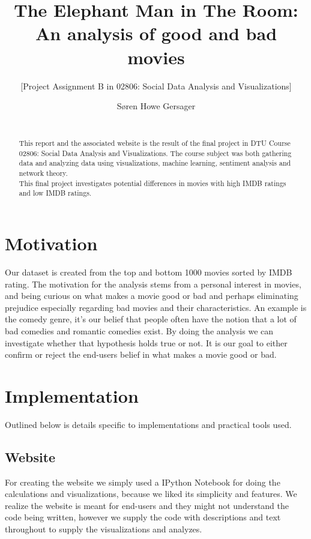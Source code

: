\documentclass{acm_proc_article-sp}
\begin{document}
\title{The Elephant Man in The Room: An analysis of good and bad movies}
\subtitle{[Project Assignment B in 02806: Social Data Analysis and Visualizations]
}
\author
{
	\alignauthor Søren Howe Gersager\\
       \\
}
\maketitle
\begin{abstract}
This report and the associated website\cite{website} is the result of the final project in DTU Course 02806: Social Data Analysis and Visualizations. The course subject was both gathering data and analyzing data using visualizations, machine learning, sentiment analysis and network theory.\\
This final project investigates potential differences in movies with high IMDB ratings and low IMDB ratings.
\end{abstract}

\section{Motivation}
Our dataset is created from the top and bottom 1000 movies sorted by IMDB rating\cite{imdb-top}\cite{imdb-bottom}. The motivation for the analysis stems from a personal interest in movies, and being curious on what makes a movie good or bad and perhaps eliminating prejudice especially regarding bad movies and their characteristics. An example is the comedy genre, it's our belief that people often have the notion that a lot of bad comedies and romantic comedies exist. By doing the analysis we can investigate whether that hypothesis holds true or not. It is our goal to either confirm or reject the end-users belief in what makes a movie good or bad.  
\section{Implementation}
Outlined below is details specific to implementations and practical tools used.
\subsection{Website}
For creating the website we simply used a IPython Notebook for doing the calculations and visualizations, because we liked its simplicity and features. We realize the website is meant for end-users and they might not understand the code being written, however we supply the code with descriptions and text throughout to supply the visualizations and analyzes.
\end{document}
